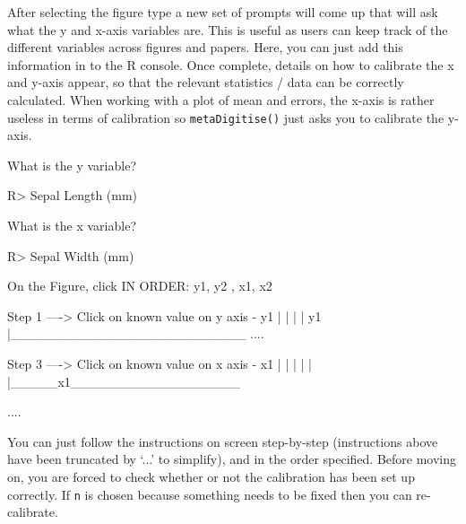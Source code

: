 \documentclass[12pt]{article}
\newcommand{\code}[1]{\texttt{#1}}
\newcommand{\fct}[1]{\texttt{#1()}}
\let\proglang=\textsf
\begin{document}
After selecting the figure type a new set of prompts will come up that will ask what the y and x-axis variables are. This is useful as users can keep track of the different variables across figures and papers. Here, you can just add this information in to the \proglang{R} console. Once complete, details on how to calibrate the x and y-axis appear, so that the relevant statistics / data can be correctly calculated. When working with a plot of mean and errors, the x-axis is rather useless in terms of calibration so \fct{metaDigitise} just asks you to calibrate the y-axis. 

\begin{CodeChunk}
\begin{CodeOutput}
What is the y variable? 
\end{CodeOutput}
\begin{CodeInput}
R> Sepal Length (mm)
\end{CodeInput}

\begin{CodeOutput}
What is the x variable? 
\end{CodeOutput}
\begin{CodeInput}
R> Sepal Width (mm)
\end{CodeInput}

\begin{CodeOutput}
On the Figure, click IN ORDER: 
      y1, y2 , x1, x2  


    Step 1 ----> Click on known value on y axis - y1
  |
  |
  |
  |
  y1
  |_________________________
  ....

    Step 3 ----> Click on known value on x axis - x1
  |
  |
  |
  |
  |
  |_____x1__________________

  ....
\end{CodeOutput}
\end{CodeChunk}

You can just follow the instructions on screen step-by-step (instructions above have been truncated by `...' to simplify), and in the order specified. Before moving on, you are forced to check whether or not the calibration has been set up correctly. If \code{n} is chosen because something needs to be fixed then you can re-calibrate.
\end{document}
